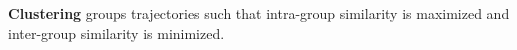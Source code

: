 \documentclass[
]{ceurart}
\newcommand{\mg}[1]{{\color{red}{\textbf{#1}}}}
\begin{document}
\textbf{Clustering}
groups trajectories such that intra-group similarity is maximized and inter-group similarity is minimized. 
\end{document}
